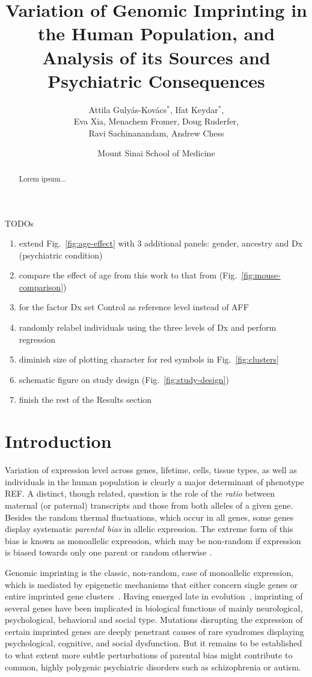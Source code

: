 \documentclass[letterpaper]{article}
\title{Variation of Genomic Imprinting in the Human Population,
and Analysis of its Sources and Psychiatric Consequences}
\author{Attila Guly\'{a}s-Kov\'{a}cs\(^\ast\), Ifat Keydar\(^\ast\),\\
Eva Xia, Menachem Fromer, Doug Ruderfer,\\
Ravi Sachinanandam, Andrew Chess}
\date{Mount Sinai School of Medicine}
\begin{document}
\maketitle

TODOs
\begin{enumerate}
\item extend Fig.~\ref{fig:age-effect} with 3 additional panels: gender,
ancestry and Dx (psychiatric condition)
\item compare the effect of age from this work to that from
\cite{Perez2015} (Fig.~\ref{fig:mouse-comparison})
\item for the factor Dx set Control as reference level instead of AFF
\item randomly relabel individuals using the three levels of Dx and perform
regression
\item diminish size of plotting character for red symbols in
Fig.~\ref{fig:clusters} 
\item schematic figure on study design (Fig.~\ref{fig:study-design}) 
\item finish the rest of the Results section
\end{enumerate}

\newpage

\maketitle

\begin{abstract}
Lorem ipsum...
\end{abstract}

\section{Introduction}

Variation of expression level across genes, lifetime, cells, tissue types, as
well as individuals in the human population is clearly a major determinant of
phenotype REF.  A distinct, though related, question is the role of the
\emph{ratio} between maternal (or paternal) transcripts and those from both
alleles of a given gene.  Besides the random thermal fluctuations, which occur
in all genes, some genes display systematic \emph{parental bias} in allelic
expression.  The extreme form of this bias is known as monoallelic expression,
which may be non-random if expression is biased towards only one parent or
random otherwise \cite{Chess2012}.

Genomic imprinting is the classic, non-random, case of monoallelic expression,
which is mediated by epigenetic mechanisms that either concern single genes or
entire imprinted gene clusters~\cite{Peters2014,Plasschaert2014}.  Having
emerged late in evolution~\cite{Tucci2016}, imprinting of several genes have
been implicated in biological functions of mainly neurological, psychological,
behavioral and social type.  Mutations disrupting the expression of certain
imprinted genes are deeply penetrant causes of rare syndromes displaying
psychological, cognitive, and social dysfunction.  But it remains to be
established to what extent more subtle perturbations of parental bias might
contribute to common, highly polygenic psychiatric disorders such as
schizophrenia or autism.
\end{document}
